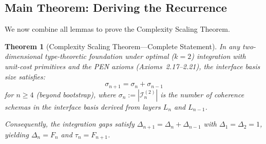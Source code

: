 \documentclass[11pt]{article}
\newtheorem{theorem}{Theorem}[section]
\theoremstyle{definition}
\theoremstyle{remark}
\begin{document}
\subsection{Main Theorem: Deriving the Recurrence}
\label{app:main-theorem}

We now combine all lemmas to prove the Complexity Scaling Theorem.

\begin{theorem}[Complexity Scaling Theorem---Complete Statement]
\label{thm:CST-complete}
In any two-dimensional type-theoretic foundation under optimal ($k=2$) integration with unit-cost
primitives and the PEN axioms (Axioms~2.17--2.21), the interface basis size satisfies:
\[
\sigma_{n+1} = \sigma_n + \sigma_{n-1}
\]
for $n \geq 4$ (beyond bootstrap), where $\sigma_n := |\mathcal{I}_n^{(2)}|$ is the number of coherence schemas
in the interface basis derived from layers $L_n$ and $L_{n-1}$.

Consequently, the integration gaps satisfy $\Delta_{n+1} = \Delta_n + \Delta_{n-1}$ with $\Delta_1 = \Delta_2 = 1$,
yielding $\Delta_n = F_n$ and $\tau_n = F_{n+1}$.
\end{theorem}
\end{document}
